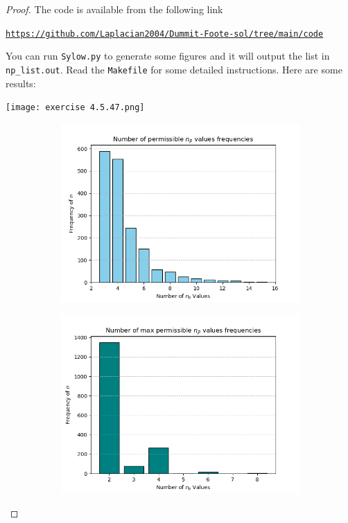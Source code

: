 \documentclass{article}
\begin{document}
\begin{proof}
    The code is available from the following link
    \begin{center}
        \texttt{\url{https://github.com/Laplacian2004/Dummit-Foote-sol/tree/main/code}}
    \end{center}
    You can run \texttt{Sylow.py} to generate some figures and it will output the list in \texttt{np\_list.out}. Read the \texttt{Makefile} for some detailed instructions. Here are some results:
\begin{center}
        \texttt{[image: exercise 4.5.47.png]}
\begin{figure}[htbp]
    
    \begin{subfigure}{0.5\textwidth}
        \includegraphics[width=\linewidth]{picture/exercise 4.5.47-2.png}
 \end{subfigure}
 \begin{subfigure}{0.5\textwidth}
        \includegraphics[width=\linewidth]{picture/exercise 4.5.47-3.png}
 \end{subfigure}
\end{figure}
\end{center}


\end{proof}
\end{document}

